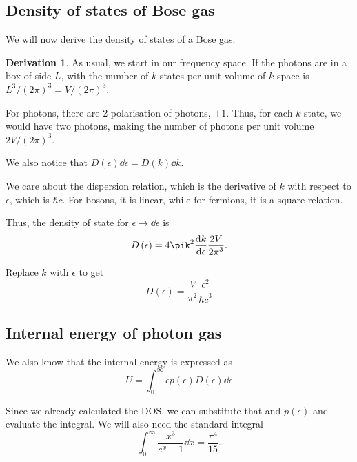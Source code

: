\documentclass[12pt,chapterprefix=false,dvipsnames]{scrbook}
\theoremstyle{dotless}
\theoremstyle{definition}
\newtheorem{protoderivation}{Derivation}[section]
\newenvironment{derivation}
{\colorlet{shadecolor}{purple!15}\begin{shaded}\begin{protoderivation}}
			{\end{protoderivation}\end{shaded}}
\begin{document}
\subsection{Density of states of Bose gas}%
\label{sub:density_of_states_of_bose_gas}%

We will now derive the density of states of a Bose gas.

\begin{derivation}
	As usual, we start in our frequency space. If the photons are in
	a box of side $L$, with the number of
	$k$-states per unit volume of
	$k$-space is $L^3/{\left(2\pi\right)}^3 = V/{\left(2\pi\right)}^3$.

	For photons, there are 2 polarisation of photons,
	$\pm 1$. Thus, for each
	$k$-state, we would have two photons, making
	the number of photons per unit volume $2V/{\left(2\pi\right)}^3$.

	We also notice that $D\left(\epsilon\right)\dd{\epsilon} =
		D\left(k\right)\dd{k}$.

	We care about the dispersion relation, which is the derivative
	of $k$ with respect to
	$\epsilon$, which is $\hbar c$. For
	bosons, it is linear, while for fermions, it is a square
	relation.

	Thus, the density of state for $\epsilon\rightarrow\dd{\epsilon}$ is
	\begin{equation}
		D\left(\epsilon\right) =
		4\pik^2\dv{k}{\epsilon}\frac{2V}{{2\pi}^3}.
	\end{equation}

	Replace $k$ with $\epsilon$ to
	get
	\begin{equation}
		\label{eq:density_of_states_photon_gas}
		D\left(\epsilon\right) =
		\frac{V}{\pi^2}\frac{\epsilon^2}{{\hbar c}^3}
	\end{equation}
\end{derivation}

\subsection{Internal energy of photon gas}%
\label{sub:internal_energy_of_photon_gas}%

We also know that the internal energy is expressed as
\begin{equation}
	U = \int_0^\infty\epsilon
	p\left(\epsilon\right)D\left(\epsilon\right)\dd{\epsilon}
\end{equation}

Since we already calculated the DOS, we can substitute that and
$p\left(\epsilon\right)$ and evaluate the integral. We will also
need the standard integral
\begin{equation}
	\int^\infty_0\frac{x^3}{e^x-1}\dd{x}
	=
	\frac{\pi^4}{15}.
\end{equation}
\end{document}
